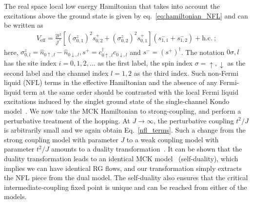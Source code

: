 \documentclass[reprint,prb,superscriptaddress]{revtex4-2}
\begin{document}
The real space local low energy Hamiltonian that takes into account the excitations above the ground state is given by eq.~\ref{eq:hamiltonian_NFL} and can be written as
\begin{equation}\begin{aligned}
	\label{nfl_terms}
	V_\text{eff} = \frac{2t^2}{{\mathcal{J}^*}}\left[\left(\sigma^z_{0,1}\right)^2 s^+_{0,2} + \left(\sigma^z_{0,2}\right)^2 s^+_{0,1}\right] \left(s^-_{1,1} + s^-_{1,2}\right) + \text{h.c.}~;
\end{aligned}\end{equation}
here, \(\sigma^z_{0,l} = \hat n_{0\uparrow,l} - \hat n_{0\downarrow,l}, s^+ = c^\dagger_{0 \uparrow,l}c_{0 \downarrow,l}\) and \(s^- = \left(s^+\right)^\dagger\). The notation \(0\sigma,l\) has the site index \(i=0,1,2,\ldots\) as the first label, the spin index \(\sigma=\uparrow,\downarrow\) as the second label and the channel index \(l=1,2\) as the third index.
Such non-Fermi liquid (NFL) terms in the effective Hamiltonian and the absence of any Fermi-liquid term at the same order should be contrasted with the local Fermi liquid excitations induced by the singlet ground state of the single-channel Kondo model~\cite{nozieres1974fermi,wilson1975renormalization,hewson1993}.
We now take the MCK Hamiltonian to strong-coupling, and perform a perturbative treatment of the hopping.
At \(J \to \infty\), the perturbative coupling \(t^2/J\) is arbitrarily small and we again obtain Eq.~\ref{nfl_terms}. Such a change from the strong coupling model with parameter \(J\) to a weak coupling model with parameter \(t^2/J\) amounts to a duality transformation~\cite{kroha_kolf_2007,zitko_fabrizio_2017}.
It can be shown that the duality transformation leads to an identical MCK model~\cite{kroha_kolf_2007} (self-duality), which implies we can have identical RG flows, and our transformation simply extracts the NFL piece from the dual model.
The self-duality also ensures that the critical intermediate-coupling fixed point is unique and can be reached from either of the models.
\end{document}
